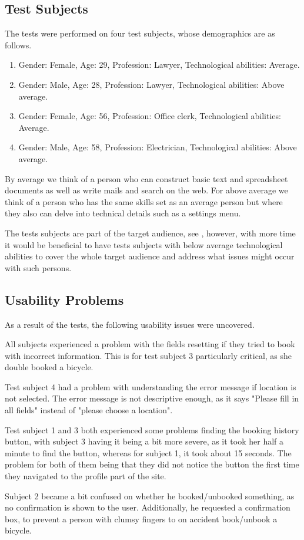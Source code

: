\subsection{Test Subjects}
The tests were performed on four test subjects, whose demographics are as follows.
\begin{enumerate}
\item Gender: Female, Age: 29, Profession: Lawyer, Technological abilities: Average.
\item Gender: Male, Age: 28, Profession: Lawyer, Technological abilities: Above average.
\item Gender: Female, Age: 56, Profession: Office clerk, Technological abilities: Average.
\item Gender: Male, Age: 58, Profession: Electrician, Technological abilities: Above average.
\end{enumerate}

By average we think of a person who can construct basic text and spreadsheet documents as well as write mails and search on the web.
For above average we think of a person who has the same skills set as an average person but where they also can delve into technical details such as a settings menu.

The tests subjects are part of the target audience, see , however, with more time it would be beneficial to have tests subjects with below average technological abilities to cover the whole target audience and address what issues might occur with such persons.
\subsection{Usability Problems}
As a result of the tests, the following usability issues were uncovered.

\begin{description}[style=nextline]
	\item[{\#}1 Fields reset]
		All subjects experienced a problem with the fields resetting if they tried to book with incorrect information.
		This is for test subject 3 particularly critical, as she double booked a bicycle.
	\item[{\#}2 Error message understandability] Test subject 4 had a problem with understanding the error message if location is not selected.
	The error message is not descriptive enough, as it says "Please fill in all fields" instead of "please choose a location".
	\item[{\#}3 Difficulty finding history] Test subject 1 and 3 both experienced some problems finding the booking history button, with subject 3 having it being a bit more severe, as it took her half a minute to find the button, whereas for subject 1, it took about 15 seconds. 
	The problem for both of them being that they did not notice the button the first time they navigated to the profile part of the site.
	\item[{\#}4 Booking/Unbooking confirmation] Subject 2 became a bit confused on whether he booked/unbooked something, as no confirmation is shown to the user.
	Additionally, he requested a confirmation box, to prevent a person with clumsy fingers to on accident book/unbook a bicycle.
\end{description}

